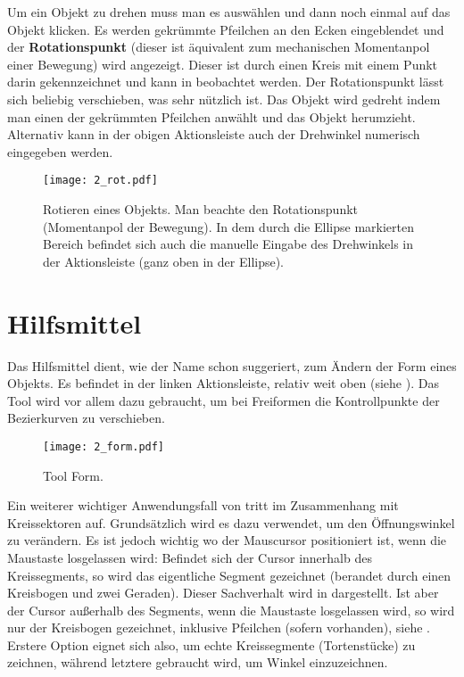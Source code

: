 Um ein Objekt zu drehen muss man es auswählen und dann noch einmal auf das
Objekt klicken. Es werden gekrümmte Pfeilchen an den Ecken eingeblendet und
der {\bf Rotationspunkt} (dieser ist äquivalent zum mechanischen Momentanpol
einer Bewegung) wird angezeigt. Dieser ist durch einen Kreis mit einem Punkt
darin gekennzeichnet und kann in  beobachtet werden.
Der Rotationspunkt lässt sich beliebig verschieben, was sehr nützlich ist. 
Das Objekt wird gedreht indem man einen der gekrümmten Pfeilchen anwählt und 
das Objekt herumzieht. Alternativ kann in der obigen Aktionsleiste auch der 
Drehwinkel numerisch eingegeben werden.

\begin{figure}[htbp]
  \texttt{[image: 2\_rot.pdf]}
  \caption{Rotieren eines Objekts. Man beachte den Rotationspunkt (Momentanpol 
    der Bewegung). In dem durch die Ellipse markierten Bereich befindet sich 
    auch die manuelle Eingabe des Drehwinkels in der Aktionsleiste 
    (ganz oben in der Ellipse).}
  \label{fig:rot}
\end{figure}

\newpage
\section{Hilfsmittel }

Das Hilfsmittel  dient, wie der Name schon suggeriert, zum Ändern
der Form eines Objekts. Es befindet in der linken Aktionsleiste, relativ weit
oben (siehe ). Das Tool wird vor allem dazu gebraucht, um bei
Freiformen die Kontrollpunkte der Bezierkurven zu verschieben.

\begin{figure}[htbp]
  \texttt{[image: 2\_form.pdf]}
  \caption{Tool Form.}
  \label{fig:form}
\end{figure}

Ein weiterer wichtiger Anwendungsfall von  tritt im Zusammenhang
mit Kreissektoren auf. Grundsätzlich wird es dazu verwendet, um den 
Öffnungswinkel zu verändern. Es ist jedoch wichtig wo der Mauscursor
positioniert ist, wenn die Maustaste losgelassen wird: Befindet sich der Cursor
innerhalb des Kreissegments, so wird das eigentliche Segment gezeichnet 
(berandet durch einen Kreisbogen und zwei Geraden). Dieser Sachverhalt wird in 
 dargestellt. Ist aber der Cursor außerhalb des Segments,
wenn die Maustaste losgelassen wird, so wird nur der Kreisbogen gezeichnet,
inklusive Pfeilchen (sofern vorhanden), siehe . 
Erstere Option eignet sich also, um echte Kreissegmente 
(\glqq{}Tortenstücke\grqq{}) zu zeichnen, während letztere gebraucht wird, um 
Winkel einzuzeichnen.

